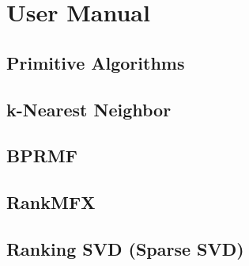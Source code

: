 
\chapter{User Manual}


\section{Primitive Algorithms}


\section{k-Nearest Neighbor}


\section{BPRMF}


\section{RankMFX}


\section{Ranking SVD (Sparse SVD)}
